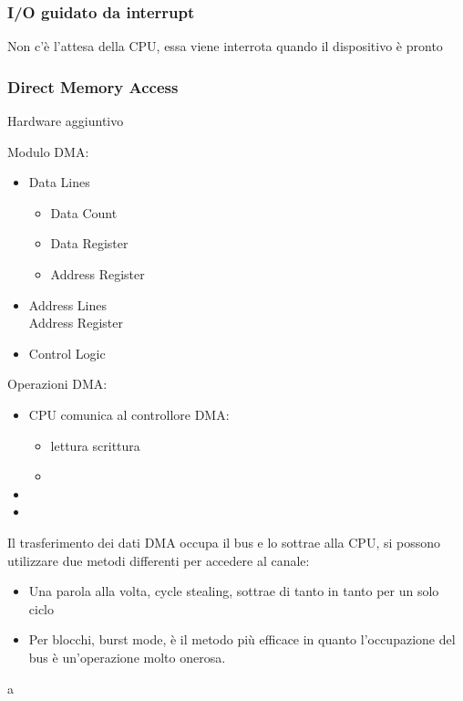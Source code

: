 \documentclass[12pt, a4paper]{report}
\begin{document}
\subsubsection{I/O guidato da interrupt}
Non c'è l'attesa della CPU, essa viene interrota quando il dispositivo è pronto

\subsubsection{Direct Memory Access}
Hardware aggiuntivo

Modulo DMA:

\begin{itemize}
	\item Data Lines
		\begin{itemize}
			\item Data Count
			\item Data Register
			\item Address Register
		\end{itemize}
	\item Address Lines\\
		Address Register
	\item Control Logic
\end{itemize}

Operazioni DMA:

\begin{itemize}
	\item CPU comunica al controllore DMA:

		\begin{itemize}
			\item lettura scrittura
			\item 
		\end{itemize}
	\item 
	\item 
\end{itemize}

Il trasferimento dei dati DMA occupa il bus e lo sottrae alla CPU, si possono
utilizzare due metodi differenti per accedere al canale:

\begin{itemize}
	\item Una parola alla volta, cycle stealing, sottrae di tanto in tanto
		per un solo ciclo
	\item Per blocchi, burst mode, è il metodo più efficace in quanto 
		l'occupazione del bus è un'operazione molto onerosa.
\end{itemize}
a
\end{document}
